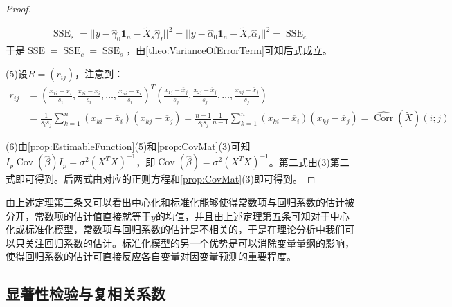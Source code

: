 \begin{proof}
\begin{gather*}
\begin{aligned}
		\end{aligned} \\
		\operatorname{SSE}_s=||y-\hat{\gamma}_0\mathbf{1}_n-\tilde{X}_s\hat{\gamma}_I||^2=||y-\hat{\alpha}_0\mathbf{1}_n-\tilde{X}_c\hat{\alpha}_I||^2=\operatorname{SSE}_c
	\end{gather*}
	于是$\operatorname{SSE}=\operatorname{SSE}_c=\operatorname{SSE}_s$，由\cref{theo:VarianceOfErrorTerm}可知后式成立。\par
	(5)设$R=(r_{ij})$，注意到：
	\begin{align*}
		r_{ij}&=\left(\frac{x_{1i}-\overline{x}_i}{s_i},\frac{x_{2i}-\overline{x}_i}{s_i},\dots,\frac{x_{ni}-\overline{x}_i}{s_i}\right)^T\left(\frac{x_{1j}-\overline{x}_j}{s_j},\frac{x_{2j}-\overline{x}_j}{s_j},\dots,\frac{x_{nj}-\overline{x}_j}{s_j}\right) \\
		&=\frac{1}{s_is_j}\sum_{k=1}^{n}(x_{ki}-\overline{x}_i)(x_{kj}-\overline{x}_j)=\frac{n-1}{s_is_j}\frac{1}{n-1}\sum_{k=1}^{n}(x_{ki}-\overline{x}_i)(x_{kj}-\overline{x}_j)=\widehat{\operatorname{Corr}}(\tilde{X})(i;j)
	\end{align*}\par
	(6)由\cref{prop:EstimableFunction}(5)和\cref{prop:CovMat}(3)可知$I_p\operatorname{Cov}(\hat{\beta})I_p=\sigma^2(X^TX)^{-1}$，即$\operatorname{Cov}(\hat{\beta})=\sigma^2(X^TX)^{-1}$。第二式由(3)第二式即可得到。后两式由对应的正则方程和\cref{prop:CovMat}(3)即可得到。
\end{proof}
\begin{note}
	由上述定理第三条又可以看出中心化和标准化能够使得常数项与回归系数的估计被分开，常数项的估计值直接就等于$y$的均值，并且由上述定理第五条可知对于中心化或标准化模型，常数项与回归系数的估计是不相关的，于是在理论分析中我们可以只关注回归系数的估计。标准化模型的另一个优势是可以消除变量量纲的影响，使得回归系数的估计可直接反应各自变量对因变量预测的重要程度。
\end{note}

\subsection{显著性检验与复相关系数}
